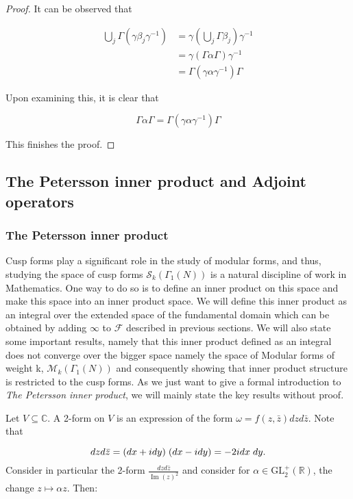 \begin{proposition}
\begin{proof}
It can be observed that 

\[
\begin{aligned}
\bigcup_{j} \Gamma(\gamma \beta_{j} \gamma^{-1}) &= \gamma(\bigcup_{j} \Gamma \beta_{j}) \gamma^{-1} \\
&= \gamma (\Gamma \alpha \Gamma) \gamma^{-1} \\
&= \Gamma (\gamma \alpha \gamma^{-1}) \Gamma
\end{aligned}
\]

Upon examining this, it is clear that

\[
\Gamma \alpha \Gamma = \Gamma (\gamma \alpha \gamma^{-1}) \Gamma
\]

This finishes the proof. 
\end{proof}
 \end{proposition}
 \subsection{The Petersson inner product and Adjoint operators}
\subsubsection{The Petersson inner product}
Cusp forms play a significant role in the study of modular forms, and thus, studying the space of cusp forms $\mathcal{S}_k(\Gamma_1(N))$ is a natural discipline of work in Mathematics. One way to do so is to define an inner product on this space and make this space into an inner product space. We will define this inner product as an integral over the extended space of the fundamental domain which can be obtained by adding  $\infty$ to $\mathcal{F}$ described in previous sections. We will also state some important results, namely that this inner product defined as an integral does not converge over the bigger space namely the space of Modular forms of weight k, $\mathcal{M}_k(\Gamma_1(N))$ and consequently showing that inner product structure is restricted to the cusp forms. As we just want to give a formal introduction to \textit{The Petersson inner product}, we will mainly state the key results without proof. 

\vspace{1cm}
Let $V \subseteq \mathbb{C}$. A 2-form on $V$ is an expression of the form $\omega=f(z, \bar{z}) d z  d \bar{z}$. Note that

$$
d z d \bar{z}=(d x+i d y)\hspace{0.1cm}(d x-i d y)=-2 i d x\hspace{0.1cm} d y.
$$ Consider in particular the 2-form $\frac{d z d \bar{z}}{\operatorname{Im}(z)^{2}}$ and consider for $\alpha \in \mathrm{GL}_{2}^{+}(\mathbb{R})$, the change $z \mapsto \alpha z$. Then:

